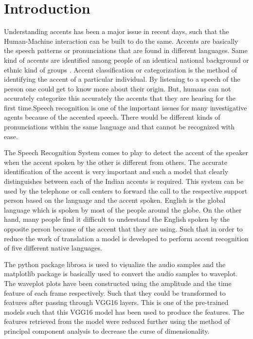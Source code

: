 \documentclass[pdflatex]{sn-jnl}%
\theoremstyle{thmstyleone}%
\theoremstyle{thmstyletwo}%
\theoremstyle{thmstylethree}%
\begin{document}
\section{Introduction}\label{sec1}
Understanding accents has been a major issue in recent days, such that the Human-Machine interaction can be built to do the same. Accents are basically the speech patterns or pronunciations that are found in different languages. Same kind of accents are identified among people of an identical national background or ethnic kind of groups \cite{b1}. Accent classification or categorization is the method of identifying the accent of a particular individual. By listening to a speech of the person one could get to know more about their origin. But, humans can not accurately categorize this accurately the accents that they are hearing for the first time.Speech recognition \cite{b2} is one of the important issues for many investigative agents because of the accented speech. There would be different kinds of pronunciations within the same language and that cannot be recognized with ease.

The Speech Recognition System \cite{b3} comes to play to detect the accent of the speaker when the accent spoken by the other is different from others. The accurate identification of the accent is very important and such a model that clearly distinguishes between each of the Indian accents is required. This system can be used by the telephone or call centers to forward the call to the respective support person based on the language and the accent spoken.  English is the global language which is spoken by most of the people around the globe. On the other hand, many people find it difficult to understand the English spoken by the opposite person because of the accent that they are using. Such that in order to reduce the work of translation a model is developed to perform accent recognition of five different native languages.  

The python package librosa \cite{b4} is used to viṣualize the audio samples and the matplotlib package is basically used to convert the audio samples to waveplot. The waveplot plots have been constructed using the amplitude and the time feature of each frame respectively. Such that they could be transformed to features after passing through VGG16 layers. This is one of the pre-trained models such that this VGG16 model has been used to produce the features. The features retrieved from the model were reduced further using the method of principal component analysis \cite{b5} to decrease the curse of dimensionality.    
\end{document}
